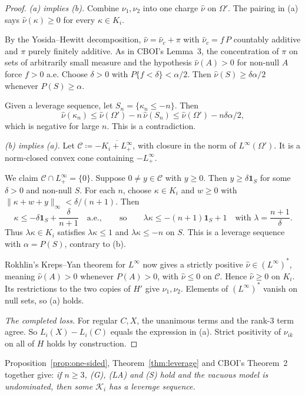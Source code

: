 \documentclass[11pt]{article}
\theoremstyle{remark}\newtheorem{remark}[theorem]{Remark}
\newcommand{\Kscr}{\mathcal K}
\newcommand{\one}{\mathbf 1}
\begin{document}
\begin{proof}
\emph{(a) implies (b).} Combine $\nu_1,\nu_2$ into one charge $\hat\nu$ on
$\Omega'$. The pairing in (a) says $\hat\nu(\kappa)\ge0$ for every
$\kappa\in K_i$.

By the Yosida--Hewitt decomposition, $\hat\nu=\hat\nu_c+\pi$ with
$\hat\nu_c=f\,P$ countably additive and $\pi$ purely finitely additive.
As in CBOI's Lemma~3, the concentration of $\pi$ on sets of arbitrarily small
measure and the hypothesis $\hat\nu(A)>0$ for non-null $A$ force $f>0$ a.e.
Choose $\delta>0$ with $P\{f<\delta\}<\alpha/2$. Then $\hat\nu(S)\ge\delta\alpha/2$
whenever $P(S)\ge\alpha$.

Given a leverage sequence, let $S_n=\{\kappa_n\le-n\}$. Then
\[
 \hat\nu(\kappa_n)\le\hat\nu(\Omega')-n\,\hat\nu(S_n)
 \le\hat\nu(\Omega')-n\delta\alpha/2,
\]
which is negative for large $n$. This is a contradiction.

\emph{(b) implies (a).} Let $\mathcal C\coloneqq-\overline{K_i+L^\infty_+}$,
with closure in the norm of $L^\infty(\Omega')$. It is a norm-closed convex
cone containing $-L^\infty_+$.

We claim $\mathcal C\cap L^\infty_+=\{0\}$. Suppose $0\ne y\in\mathcal C$ with
$y\ge0$. Then $y\ge\delta\one_S$ for some $\delta>0$ and non-null $S$. For each
$n$, choose $\kappa\in K_i$ and $w\ge0$ with
$\|\kappa+w+y\|_\infty<\delta/(n+1)$. Then
\[
 \kappa\le-\delta\one_S+\frac{\delta}{n+1}\quad\text{a.e.},
 \qquad\text{so}\qquad
 \lambda\kappa\le-(n+1)\one_S+1\quad\text{with }\lambda=\frac{n+1}{\delta}.
\]
Thus $\lambda\kappa\in K_i$ satisfies $\lambda\kappa\le1$ and
$\lambda\kappa\le-n$ on $S$. This is a leverage sequence with $\alpha=P(S)$,
contrary to (b).

Rokhlin's Kreps--Yan theorem for $L^\infty$ \cite{Rokhlin} now gives a strictly
positive $\hat\nu\in(L^\infty)^*$, meaning $\hat\nu(A)>0$ whenever $P(A)>0$,
with $\hat\nu\le0$ on $\mathcal C$. Hence $\hat\nu\ge0$ on $K_i$. Its
restrictions to the two copies of $H'$ give $\nu_1,\nu_2$. Elements of
$(L^\infty)^*$ vanish on null sets, so (a) holds.

\emph{The completed loss.} For regular $C,X$, the unanimous terms and the
rank-$3$ term agree. So $L_i(X)-L_i(C)$ equals the expression in (a).
Strict positivity of $\nu_{ik}$ on all of $H$ holds by construction.
\end{proof}

Proposition~\ref{prop:one-sided}, Theorem~\ref{thm:leverage} and CBOI's
Theorem~2 together give: \emph{if $n\ge3$, (G), (LA) and (S) hold and the
vacuous model is undominated, then some $\Kscr_i$ has a leverage sequence.}
\end{document}
